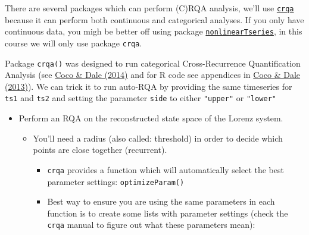 \documentclass[]{book}
\providecommand{\tightlist}{%
  \setlength{\itemsep}{0pt}\setlength{\parskip}{0pt}}
\let\BeginKnitrBlock\begin \let\EndKnitrBlock\end
\begin{document}
There are several packages which can perform (C)RQA analysis, we'll use
\href{https://cran.r-project.org/web/packages/crqa/index.html}{\texttt{crqa}}
because it can perform both continuous and categorical analyses. If you
only have continuous data, you migh be better off using package
\href{https://cran.r-project.org/web/packages/nonlinearTseries/index.html}{\texttt{nonlinearTseries}},
in this course we will only use package \texttt{crqa}.

\BeginKnitrBlock{rmdimportant}
Package \texttt{crqa()} was designed to run categorical Cross-Recurrence
Quantification Analysis (see
\href{http://journal.frontiersin.org/Journal/10.3389/fpsyg.2014.00510/abstract}{Coco
\& Dale (2014)} and for R code see appendices in
\href{http://arxiv.org/abs/1310.0201}{Coco \& Dale (2013)}). We can
trick it to run auto-RQA by providing the same timeseries for
\texttt{ts1} and \texttt{ts2} and setting the parameter \texttt{side} to
either \texttt{"upper"} or \texttt{"lower"}
\EndKnitrBlock{rmdimportant}

\begin{itemize}
\tightlist
\item
  Perform an RQA on the reconstructed state space of the Lorenz system.

  \begin{itemize}
  \tightlist
  \item
    You'll need a radius (also called: threshold) in order to decide
    which points are close together (recurrent).

    \begin{itemize}
    \tightlist
    \item
      \texttt{crqa} provides a function which will automatically select
      the best parameter settings: \texttt{optimizeParam()}
    \item
      Best way to ensure you are using the same parameters in each
      function is to create some lists with parameter settings (check
      the \texttt{crqa} manual to figure out what these parameters
      mean):
    \end{itemize}
  \end{itemize}
\end{itemize}
\end{document}
